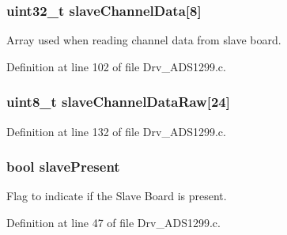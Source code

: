 \subsubsection[{\texorpdfstring{slave\+Channel\+Data}{slaveChannelData}}]{\setlength{\rightskip}{0pt plus 5cm}uint32\+\_\+t slave\+Channel\+Data\mbox{[}8\mbox{]}}\hypertarget{group__ADS1299__Library_ga35a75511ee01afa88d18d47b2a6b401b}{}\label{group__ADS1299__Library_ga35a75511ee01afa88d18d47b2a6b401b}


Array used when reading channel data from slave board. 



Definition at line 102 of file Drv\+\_\+\+A\+D\+S1299.\+c.

\subsubsection[{\texorpdfstring{slave\+Channel\+Data\+Raw}{slaveChannelDataRaw}}]{\setlength{\rightskip}{0pt plus 5cm}uint8\+\_\+t slave\+Channel\+Data\+Raw\mbox{[}24\mbox{]}}\hypertarget{group__ADS1299__Library_gafe36c371f2977643715e7d7c88465098}{}\label{group__ADS1299__Library_gafe36c371f2977643715e7d7c88465098}


Definition at line 132 of file Drv\+\_\+\+A\+D\+S1299.\+c.

\subsubsection[{\texorpdfstring{slave\+Present}{slavePresent}}]{\setlength{\rightskip}{0pt plus 5cm}bool slave\+Present}\hypertarget{group__ADS1299__Library_ga4a8b8caa32595ce77863dd529953d13b}{}\label{group__ADS1299__Library_ga4a8b8caa32595ce77863dd529953d13b}


Flag to indicate if the Slave Board is present. 



Definition at line 47 of file Drv\+\_\+\+A\+D\+S1299.\+c.

